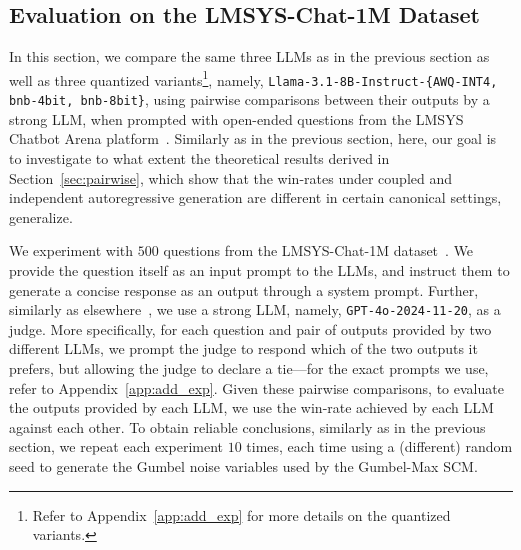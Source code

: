 \subsection{Evaluation on the LMSYS-Chat-1M Dataset}
% 
In this section, we compare the same three LLMs as in the previous section
as well as three quantized variants\footnote{Refer to Appendix~\ref{app:add_exp} for more details on the quantized variants.}, namely, \texttt{Llama-3.1-8B-Instruct-\{AWQ-INT4, bnb-4bit, bnb-8bit\}}, using pairwise comparisons between their outputs by a strong LLM, when prompted with open-ended questions from the LMSYS Chatbot Arena platform~\cite{lmsys2023chatbot}. 
%
Similarly as in the previous section, here, our goal is to investigate to what extent the theoretical results derived in Section~\ref{sec:pairwise}, which show that the win-rates under coupled and independent autoregressive generation are different in certain canonical settings, generalize.

%
We experiment with $500$ questions from the LMSYS-Chat-1M dataset~\cite{zheng2024lmsys}. We provide the question itself as an input prompt to the LLMs, and instruct them to generate a concise response as an output through a system prompt.
% 
Further, similarly as elsewhere~\cite{chatzi2024prediction,li2024llms,boyeau2024autoeval,gera2024justrank,li2023generative,zheng2023judging}, we use a strong LLM, namely, \texttt{GPT-4o-2024-11-20}, as a judge. 
%
More specifically, for each question and pair of outputs provided by two different LLMs, we prompt the judge to respond which of the two outputs it prefers, but allowing the judge to declare a tie---for the exact prompts we use, refer to Appendix~\ref{app:add_exp}.
%
Given these pairwise comparisons, to evaluate the outputs provided by each LLM, we use the win-rate achieved by each LLM against each other.
%
To obtain reliable conclusions, similarly as in the previous section, we repeat each experiment $10$ times, each time using a (different) random seed to generate the Gumbel noise variables used by the Gumbel-Max SCM.
% 

